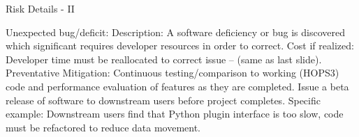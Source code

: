 \documentclass[8pt]{beamer}
\begin{document}
\begin{frame}{Risk Details - II}
    
    \begin{outline}
            \1 Unexpected bug/deficit:
            \2 Description: A software deficiency or bug is discovered which significant requires developer resources in order to correct.
            \2 Cost if realized: Developer time must be reallocated to correct issue -- (same as last slide).
            \2 Preventative Mitigation: Continuous testing/comparison to working (HOPS3) code and performance evaluation of features as they are completed. Issue a beta release of software to downstream users before project completes. 
            \2 Specific example:
                \3 Downstream users find that Python plugin interface is too slow, code must be refactored to reduce data movement.
    \end{outline}
    
\end{frame}
\end{document}
